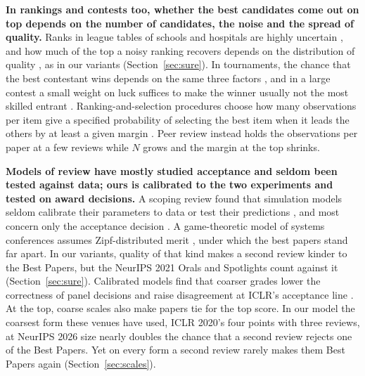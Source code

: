 \documentclass{article}
\begin{document}
\textbf{In rankings and contests too, whether the best candidates come out on top depends on the number of candidates, the noise and the spread of quality.} Ranks in league tables of schools and hospitals are highly uncertain \citep{goldstein1996league}, and how much of the top a noisy ranking recovers depends on the distribution of quality \citep{hall2010modeling,gu2023invidious}, as in our variants (Section~\ref{sec:sure}). In tournaments, the chance that the best contestant wins depends on the same three factors \citep{ryvkin2008predictive}, and in a large contest a small weight on luck suffices to make the winner usually not the most skilled entrant \citep{frank2016success}. Ranking-and-selection procedures choose how many observations per item give a specified probability of selecting the best item when it leads the others by at least a given margin \citep{bechhofer1954single}. Peer review instead holds the observations per paper at a few reviews while $N$ grows and the margin at the top shrinks.

\textbf{Models of review have mostly studied acceptance and seldom been tested against data; ours is calibrated to the two experiments and tested on award decisions.} A scoping review found that simulation models seldom calibrate their parameters to data or test their predictions \citep{feliciani2019scoping}, and most concern only the acceptance decision \citep{neff2006peer,esarey2017does,zhang2022system}. A game-theoretic model of systems conferences assumes Zipf-distributed merit \citep{anderson2009conference}, under which the best papers stand far apart. In our variants, quality of that kind makes a second review kinder to the Best Papers, but the NeurIPS 2021 Orals and Spotlights count against it (Section~\ref{sec:sure}). Calibrated models find that coarser grades lower the correctness of panel decisions \citep{feliciani2022designing} and raise disagreement at ICLR's acceptance line \citep{huang2026review}. At the top, coarse scales also make papers tie for the top score. In our model the coarsest form these venues have used, ICLR 2020's four points with three reviews, at NeurIPS 2026 size nearly doubles the chance that a second review rejects one of the Best Papers. Yet on every form a second review rarely makes them Best Papers again (Section~\ref{sec:scales}).
\end{document}
